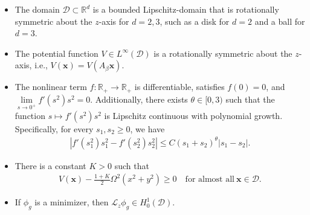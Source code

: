 \documentclass[preprint,3p]{elsarticle}
\begin{document}
\begin{itemize}%
	\item[\bf (A1)] {The domain} $\mathcal{D}\subset\mathbb{R}^d$ is a bounded Lipschitz-domain that is rotationally symmetric about the $z$-axis for $d=2, 3$, such as a disk for $d=2$ and a ball for $d=3$.
	\item[\bf (A2)] {The potential function} $V\in L^{\infty}(\mathcal{D})$ is a rotationally symmetric about the $z$-axis, i.e., $V(\bm{x})=V(A_{\beta}\bm{x})$. 
	\item[\bf (A3)] {The nonlinear term} $f \colon \mathbb{R}_{+} \to \mathbb{R}_{+}$ is differentiable, satisfies $f(0) = 0$, and $\lim\limits_{s \to 0^+} f'(s^2)s^2 = 0$. Additionally, there exists $\theta \in [0,3)$ such that the function $s \mapsto f'(s^2)s^2$ is Lipschitz continuous with polynomial growth. Specifically, for every $s_1, s_2 \ge 0$, we have
	\begin{align*}
		\left| f'(s_1^2)s_1^2 - f'(s_2^2)s_2^2 \right| \le C (s_1 + s_2)^{\theta} |s_1 - s_2|.
	\end{align*}
	\item[\bf (A4)] There is a constant $K>0$ such that
	\begin{align*}
		V(\bm{x})-\frac{1+K}{2}\Omega^2(x^2+y^2)\ge0\quad \text{for almost all}\ \bm{x}\in\mathcal{D}.
	\end{align*}
	\item[\bf (A5)] If $\phi_g$ is a minimizer, then $\mathcal{L}_z\phi_g\in H_0^1(\mathcal{D})$.
\end{itemize}

\medskip
\end{document}
